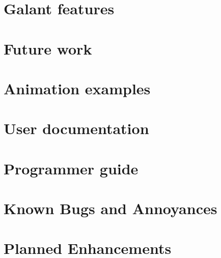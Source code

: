 \documentclass{article}
\begin{document}


\section{Galant features}\label{sec:galant_features}





\section{Future work}







\clearpage

\appendix

\section{Animation examples}
\label{sec:animations}


\clearpage

\section{User documentation}
\label{sec:user_documentation}


\clearpage

\section{Programmer guide}
\label{sec:programmer_guide}


\clearpage

\section{Known Bugs and Annoyances}
\label{sec:bugs}


\clearpage

\section{Planned Enhancements}
\label{sec:enhancements}


\end{document}
